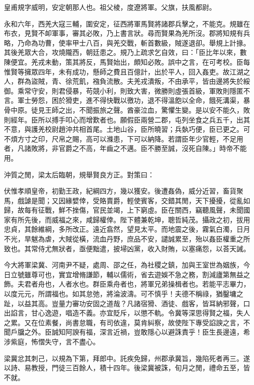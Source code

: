 
\begin{pinyinscope}
皇甫規字威明，安定朝那人也。祖父棱，度遼將軍。父旗，扶風都尉。

永和六年，西羌大寇三輔，圍安定，征西將軍馬賢將諸郡兵擊之，不能克。規雖在布衣，見賢不卹軍事，審其必敗，乃上書言狀。尋而賢果為羌所沒。郡將知規有兵略，乃命為功曹，使率甲士八百，與羌交戰，斬首數級，賊遂退卻。舉規上計掾。其後羌眾大合，攻燒隴西，朝廷患之。規乃上疏求乞自效，曰：「臣比年以來，數陳便宜。羌戎未動，策其將反，馬賢始出，頗知必敗。誤中之言，在可考校。臣每惟賢等擁眾四年，未有成功，懸師之費且百億計，出於平人，回入姦吏。故江湖之人，群為盜賊，青、徐荒飢，襁負流散。夫羌戎潰叛，不由承平，皆由邊將失於綏御。乘常守安，則君侵暴，苟競小利，則致大害，微勝則虛張首級，軍敗則隱匿不言。軍士勞怨，困於猾吏，進不得快戰以徼功，退不得溫飽以全命，餓死溝渠，暴骨中原。徒見王師之出，不聞振旅之聲。酋豪泣血，驚懼生變。是以安不能久，敗則經年。臣所以搏手叩心而增歎者也。願假臣兩營二郡，屯列坐食之兵五千，出其不意，與護羌校尉趙沖共相首尾。土地山谷，臣所曉習；兵埶巧便，臣已更之。可不煩方寸之印，尺帛之賜，高可以滌患，下可以納降。若謂臣年少官輕，不足用者，凡諸敗將，非官爵之不高，年齒之不邁。臣不勝至誠，沒死自陳。」時帝不能用。

沖質之閒，梁太后臨朝，規舉賢良方正。對策曰：

伏惟孝順皇帝，初勤王政，紀綱四方，幾以獲安。後遭姦偽，威分近習，畜貨聚馬，戲謔是聞；又因緣嬖倖，受賂賣爵，輕使賓客，交錯其閒，天下擾擾，從亂如歸，故每有征戰，鮮不挫傷，官民並竭，上下窮虛。臣在關西，竊聽風聲，未聞國家有所先後，而威福之來，咸歸權倖。陛下體兼乾坤，聰哲純茂。攝政之初，拔用忠貞，其餘維綱，多所改正。遠近翕然，望見太平。而地震之後，霧氣白濁，日月不光，旱魃為虐，大賊從橫，流血丹野，庶品不安，譴誠累至，殆以姦臣權重之所致也。其常侍尤無狀者，亟便黜遣，披埽凶黨，收入財賄，以塞痛怨，以荅天誡。

今大將軍梁冀、河南尹不疑，處周、邵之任，為社稷之鎮，加與王室世為姻族，今日立號雖尊可也，實宜增脩謙節，輔以儒術，省去遊娛不急之務，割減廬第無益之飾。夫君者舟也，人者水也。群臣乘舟者也，將軍兄弟操楫者也。若能平志畢力，以度元元，所謂福也。如其怠弛，將淪波濤。可不慎乎！夫德不稱祿，猶鑿墉之趾，以益其高。豈量力審功安固之道哉？凡諸宿猾、酒徒、戲客，皆耳納邪聲，口出諂言，甘心逸遊，唱造不義。亦宜貶斥，以懲不軌。令冀等深思得賢之福，失人之累。又在位素餐，尚書怠職，有司依違，莫肯糾察，故使陛下專受諂諛之言，不聞戶牖之外。臣誠知阿諛有福，深言近禍，豈敢隱心以避誅責乎！臣生長邊遠，希涉紫庭，怖慴失守，言不盡心。

梁冀忿其刺己，以規為下第，拜郎中。託疾免歸，州郡承冀旨，幾陷死者再三。遂以詩、易教授，門徒三百餘人，積十四年。後梁冀被誅，旬月之閒，禮命五至，皆不就。


\end{pinyinscope}
